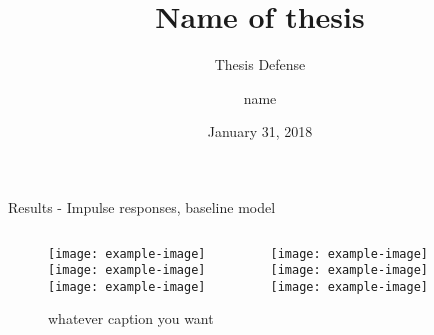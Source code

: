 \documentclass[xcolor=svgnames]{beamer}
\title[Thesis Defense]{Name of thesis}
\subtitle{Thesis Defense}
\author{name}
\institute{University}
\date{January 31, 2018}
\begin{document}
\begin{frame}{Results - Impulse responses, baseline model}

\begin{figure}
\begin{columns}[onlytextwidth]
    \begin{column}{.45\textwidth}
        \centering
        \texttt{[image: example-image]}
        \texttt{[image: example-image]}
        \texttt{[image: example-image]}
    \end{column}
    \begin{column}{.45\textwidth}
        \centering
        \texttt{[image: example-image]}
        \texttt{[image: example-image]}
        \texttt{[image: example-image]}
    \end{column}    
\end{columns}   
\caption{whatever caption you want}
\end{figure}

\end{frame}
\end{document}
